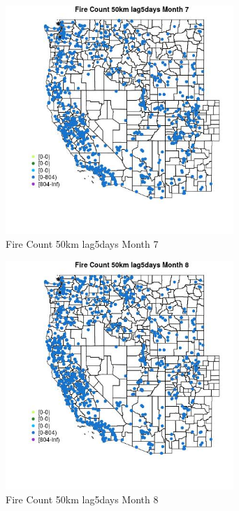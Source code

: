 \begin{figure} 
\centering  
\includegraphics[width=0.77\textwidth]{Code_Outputs/Report_ML_input_PM25_Step4_part_f_de_duplicated_aveswNAs_MapObsMo7Fire_Count_50km_lag5days.jpg} 
\caption{\label{fig:Report_ML_input_PM25_Step4_part_f_de_duplicated_aveswNAsMapObsMo7Fire_Count_50km_lag5days}Fire Count 50km lag5days Month 7} 
\end{figure} 
 

\begin{figure} 
\centering  
\includegraphics[width=0.77\textwidth]{Code_Outputs/Report_ML_input_PM25_Step4_part_f_de_duplicated_aveswNAs_MapObsMo8Fire_Count_50km_lag5days.jpg} 
\caption{\label{fig:Report_ML_input_PM25_Step4_part_f_de_duplicated_aveswNAsMapObsMo8Fire_Count_50km_lag5days}Fire Count 50km lag5days Month 8} 
\end{figure} 
 

